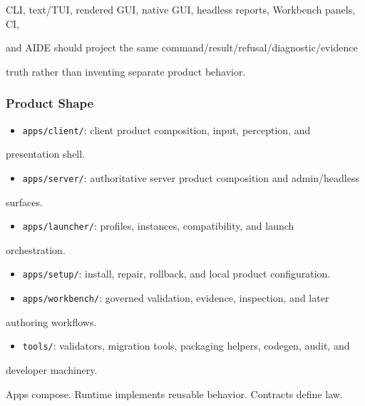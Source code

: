 \documentclass[9pt,a4paper,openany]{book}
\begin{document}
CLI, text/\allowbreak{}TUI, rendered GUI, native GUI, headless reports, Workbench panels, CI,

and AIDE should project the same command/\allowbreak{}result/\allowbreak{}refusal/\allowbreak{}diagnostic/\allowbreak{}evidence

truth rather than inventing separate product behavior.\allowbreak{}


\subsubsection{Product Shape}

\begin{itemize}
\item \texttt{apps/\allowbreak{}client/\allowbreak{}}: client product composition, input, perception, and
\end{itemize}
presentation shell.\allowbreak{}

\begin{itemize}
\item \texttt{apps/\allowbreak{}server/\allowbreak{}}: authoritative server product composition and admin/\allowbreak{}headless
\end{itemize}
surfaces.\allowbreak{}

\begin{itemize}
\item \texttt{apps/\allowbreak{}launcher/\allowbreak{}}: profiles, instances, compatibility, and launch
\end{itemize}
orchestration.\allowbreak{}

\begin{itemize}
\item \texttt{apps/\allowbreak{}setup/\allowbreak{}}: install, repair, rollback, and local product configuration.\allowbreak{}
\item \texttt{apps/\allowbreak{}workbench/\allowbreak{}}: governed validation, evidence, inspection, and later
\end{itemize}
authoring workflows.\allowbreak{}

\begin{itemize}
\item \texttt{tools/\allowbreak{}}: validators, migration tools, packaging helpers, codegen, audit, and
\end{itemize}
developer machinery.\allowbreak{}


Apps compose.\allowbreak{} Runtime implements reusable behavior.\allowbreak{} Contracts define law.\allowbreak{}
\end{document}
